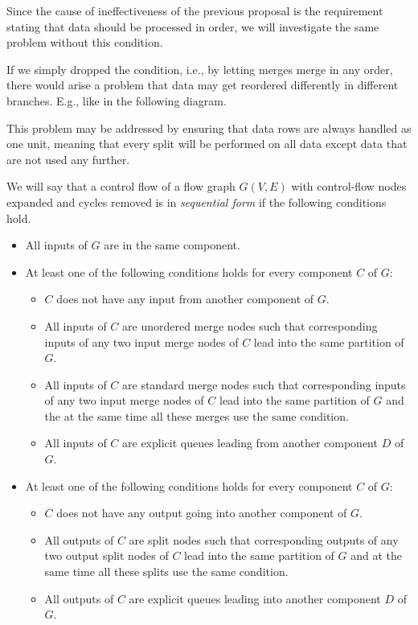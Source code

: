 Since the cause of ineffectiveness of the previous proposal is the requirement stating that data should be processed in order, we will investigate the same problem without this condition. 


If we simply dropped the condition, i.e., by letting merges merge in any order, there would arise a problem that data may get reordered differently in different branches. E.g., like in the following diagram.


This problem may be addressed by ensuring that data rows are always handled as one unit, meaning that every split will be performed on all data except data that are not used any further.

We will say that a control flow of a flow graph $G(V,E)$ with control-flow nodes expanded and cycles removed is in \emph{sequential form} if the following conditions hold.
\begin{itemize}
  \item All inputs of $G$ are in the same component.
  \item At least one of the following conditions holds for every component $C$ of $G$: 
    \begin{itemize}
      \item $C$ does not have any input from another component of $G$.
      \item All inputs of $C$ are unordered merge nodes such that corresponding inputs of any two input merge nodes of $C$ lead into the same partition of $G$.
      \item All inputs of $C$ are standard merge nodes such that corresponding inputs of any two input merge nodes of $C$ lead into the same partition of $G$ and the at the same time all these merges use the same condition.
      \item All inputs of $C$ are explicit queues leading from another component $D$ of $G$.
    \end{itemize}
  \item At least one of the following conditions holds for every component $C$ of $G$: 
    \begin{itemize}
      \item $C$ does not have any output going into another component of $G$.
      \item All outputs of $C$ are split nodes such that corresponding outputs of any two output split nodes of $C$ lead into the same partition of $G$ and at the same time all these splits use the same condition.
      \item All outputs of $C$ are explicit queues leading into another component $D$ of $G$.
    \end{itemize}
\end{itemize}
\myenddef

